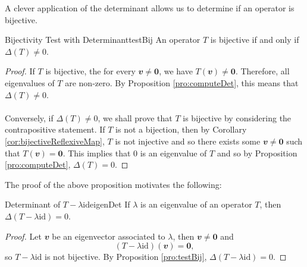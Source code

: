 \documentclass[math]{amznotes}
\theoremstyle{remark}
\newcommand{\zero}{\mathbf{0}}
\begin{document}
A clever application of the determinant allows us to determine if an operator is bijective.
\begin{probox}{Bijectivity Test with Determinant}{testBij}
    An operator $T$ is bijective if and only if $\Delta(T) \neq 0$.
    \tcblower
    \begin{proof}
        If $T$ is bijective, the for every $\mathbfit{v} \neq \zero$, we have $T(\mathbfit{v}) \neq \zero$. Therefore, all eigenvalues of $T$ are non-zero. By Proposition \ref{pro:computeDet}, this means that $\Delta(T) \neq 0$.
        \\\\
        Conversely, if $\Delta(T) \neq 0$, we shall prove that $T$ is bijective by considering the contrapositive statement. If $T$ is not a bijection, then by Corollary \ref{cor:bijectiveReflexiveMap}, $T$ is not injective and so there exists some $\mathbfit{v} \neq \zero$ such that $T(\mathbfit{v}) = \zero$. This implies that $0$ is an eigenvalue of $T$ and so by Proposition \ref{pro:computeDet}, $\Delta(T) = 0$.
    \end{proof}
\end{probox}
The proof of the above proposition motivates the following:
\begin{corbox}{Determinant of $T - \lambda\mathrm{id}$}{eigenDet}
    If $\lambda$ is an eigenvalue of an operator $T$, then $\Delta(T - \lambda\mathrm{id}) = 0$.
    \tcblower
    \begin{proof}
        Let $\mathbfit{v}$ be an eigenvector associated to $\lambda$, then $\mathbfit{v} \neq \zero$ and
        \begin{equation*}
            (T - \lambda\mathrm{id})(\mathbfit{v}) = \zero,
        \end{equation*}
        so $T - \lambda\mathrm{id}$ is not bijective. By Proposition \ref{pro:testBij}, $\Delta(T - \lambda\mathrm{id}) = 0$.
    \end{proof}
\end{corbox}
\end{document}

